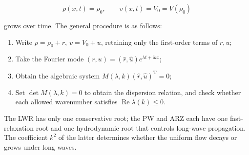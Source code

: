 \documentclass[11pt,a4paper,openany]{book}
\numberwithin{equation}{chapter}
\numberwithin{figure}{chapter}
\numberwithin{table}{chapter}
\begin{document}
\[
\rho(x,t)=\rho_0,\qquad v(x,t)=V_0=V(\rho_0)
\]

grows over time. The general procedure is as follows:







\begin{enumerate}[leftmargin=1.6em,itemsep=3pt]
\item




 Write $\rho=\rho_0+r,\ v=V_0+u$, retaining only the first-order terms of $r,u$;







\item




 Take the Fourier mode $(r,u)=(\hat r,\hat u)e^{\lambda t+\mathrm{i}kx}$;







\item




 Obtain the algebraic system $M(\lambda,k)(\hat r,\hat u)^{\mathrm T}=0$;







\item




 Set $\det M(\lambda,k)=0$ to obtain the dispersion relation, and check whether each allowed wavenumber satisfies $\operatorname{Re}\lambda(k)\le0$.







\end{enumerate}







The LWR has only one conservative root; the PW and ARZ each have one fast-relaxation root and one hydrodynamic root that controls long-wave propagation. The coefficient $k^2$ of the latter determines whether the uniform flow decays or grows under long waves.
\end{document}
